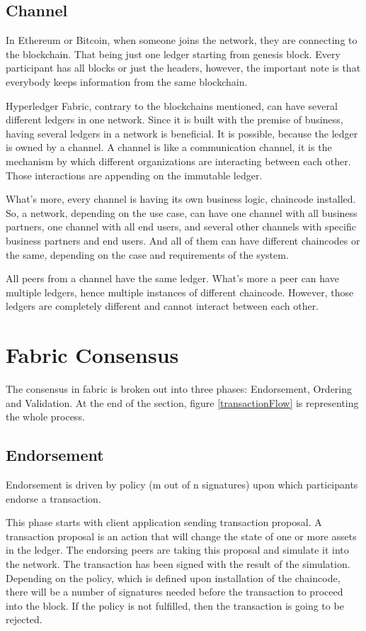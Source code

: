 \documentclass[a4paper,11pt]{report}
\begin{document}
\subsection{Channel}
In Ethereum or Bitcoin, when someone joins the network, they are connecting to the blockchain. That being just one ledger starting from genesis block. Every participant has all blocks or just the headers, however, the important note is that everybody keeps information from the same blockchain.

	Hyperledger Fabric, contrary to the blockchains mentioned, can have several different ledgers in one network. Since it is built with the premise of business, having several ledgers in a network is beneficial. It is possible, because the ledger is owned by a channel. A channel is like a communication channel, it is the mechanism by which different organizations are interacting between each other. Those interactions are appending on the immutable ledger. 
	
What's more, every channel is having its own business logic, chaincode installed. So, a network, depending on the use case, can have one channel with all business partners, one channel with all end users, and several other channels with specific business partners and end users. And all of them can have different chaincodes or the same, depending on the case and requirements of the system.

All peers from a channel have the same ledger. What's more a peer can have multiple ledgers, hence multiple instances of different chaincode. However, those ledgers are completely different and cannot interact between each other.


\section{Fabric Consensus}
\label{fabricConsensus}
The consensus in fabric is broken out into three phases: Endorsement, Ordering and Validation. At the end of the section, figure \ref{transactionFlow} is representing the whole process. 

\subsection{Endorsement}
Endorsement is driven by policy (m out of n signatures) upon which participants endorse a transaction.

	This phase starts with client application sending transaction proposal. A transaction proposal is an action that will change the state of one or more assets in the ledger. The endorsing peers are taking this proposal and simulate it into the network. The transaction has been signed with the result of the simulation. Depending on the policy, which is defined upon installation of the chaincode, there will be a number of signatures needed before the transaction to proceed into the block. If the policy is not fulfilled, then the transaction is going to be rejected.
	    
\end{document}
